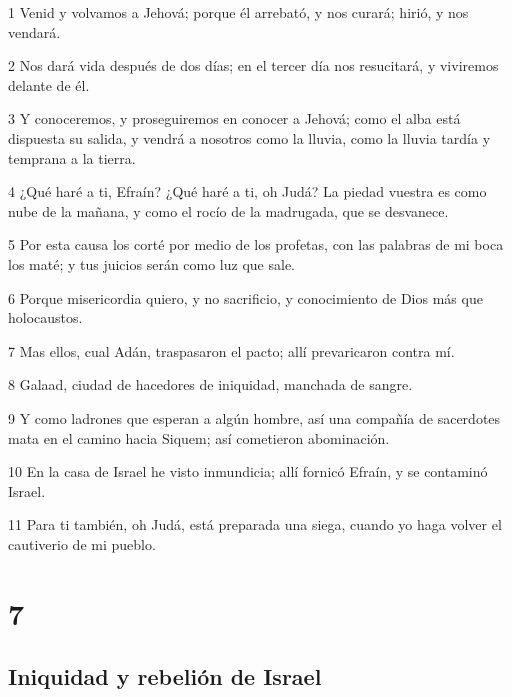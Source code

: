 \par 1 Venid y volvamos a Jehová; porque él arrebató, y nos curará; hirió, y nos vendará.
\par 2 Nos dará vida después de dos días; en el tercer día nos resucitará, y viviremos delante de él.
\par 3 Y conoceremos, y proseguiremos en conocer a Jehová; como el alba está dispuesta su salida, y vendrá a nosotros como la lluvia, como la lluvia tardía y temprana a la tierra.
\par 4 ¿Qué haré a ti, Efraín? ¿Qué haré a ti, oh Judá? La piedad vuestra es como nube de la mañana, y como el rocío de la madrugada, que se desvanece.
\par 5 Por esta causa los corté por medio de los profetas, con las palabras de mi boca los maté; y tus juicios serán como luz que sale.
\par 6 Porque misericordia quiero, y no sacrificio, y conocimiento de Dios más que holocaustos.
\par 7 Mas ellos, cual Adán, traspasaron el pacto; allí prevaricaron contra mí.
\par 8 Galaad, ciudad de hacedores de iniquidad, manchada de sangre.
\par 9 Y como ladrones que esperan a algún hombre, así una compañía de sacerdotes mata en el camino hacia Siquem; así cometieron abominación.
\par 10 En la casa de Israel he visto inmundicia; allí fornicó Efraín, y se contaminó Israel.
\par 11 Para ti también, oh Judá, está preparada una siega, cuando yo haga volver el cautiverio de mi pueblo.

\chapter{7}

\section*{Iniquidad y rebelión de Israel}

